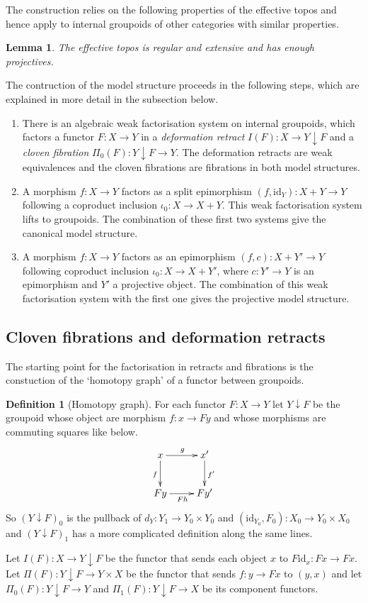 \documentclass{amsart}
\theoremstyle{plain}
\newtheorem{lemma}[theorem]{Lemma}
\theoremstyle{definition}
\newtheorem{defin}[theorem]{Definition}
\newcommand\hide[1]{}
\newcommand\id{\mathrm{id}}
\begin{document}
\hide{Hoe passen deze modelstructuren in deze paper?}


The construction relies on the following properties of the effective topos and hence apply to internal groupoids of other categories with similar properties.

\begin{lemma} The effective topos is regular and extensive and has enough projectives. \end{lemma}

\newcommand\comma{\mathbin\downarrow}
The contruction of the model structure proceeds in the following steps, which are explained in more detail in the subsection below.
\begin{enumerate}
\item There is an algebraic weak factorisation system on internal groupoids, which factors a functor $F:X\to Y$ in a \emph{deformation retract} $I(F):X\to Y\comma F$ and a \emph{cloven fibration} $\Pi_0(F):Y\comma F\to Y$. The deformation retracts are weak equivalences and the cloven fibrations are fibrations in both model structures.
\item A morphism $f:X\to Y$ factors as a split epimorphism $(f,\id_Y):X+Y \to Y$ following a coproduct inclusion $\iota_0:X\to X+Y$. This weak factorisation system lifts to groupoids. The combination of these first two systems give the canonical model structure.
\item A morphism $f:X\to Y$ factors as an epimorphism $(f,c):X+Y' \to Y$ following coproduct inclusion $\iota_0:X\to X+Y'$, where $c:Y'
\to Y$ is an epimorphism and $Y'$ a projective object. The combination of this weak factorisation system with the first one gives the projective model structure.
\end{enumerate}

\subsection{Cloven fibrations and deformation retracts}
The starting point for the factorisation in retracts and fibrations is the constuction of the `homotopy graph' of a functor between groupoids.

\begin{defin}[Homotopy graph] For each functor $F:X\to Y$ let $Y\comma F$ be the groupoid whose object are morphism $f:x\to Fy$ and whose morphisms are commuting squares like below.
\[ \xymatrix{
x\ar[d]_f \ar[r]^g & x'\ar[d]^{f'}\\
Fy \ar[r]_{Fh} & Fy'
}\]
So $(Y\comma F)_0$ is the pullback of $d_Y:Y_1 \to Y_0\times Y_0$ and $(\id_{Y_0},F_0): X_0 \to Y_0\times X_0$ and $(Y\comma F)_1$ has a more complicated definition along the same lines.

Let $I(F):X \to Y\comma F$ be the functor that sends each object $x$ to $F\id_x:Fx\to Fx$. Let $\Pi(F):Y\comma F \to Y\times X$ be the functor that sends $f:y\to Fx$ to $(y,x)$ and let $\Pi_0(F):Y\comma F \to Y$ and $\Pi_1(F):Y\comma F \to X$ be its component functors.
\end{defin} 
\end{document}

